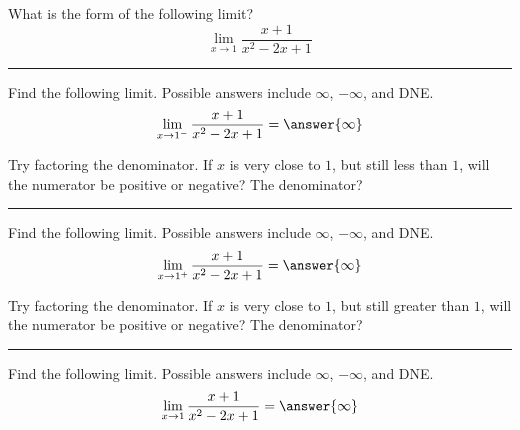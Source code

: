 \documentclass{ximera}
\author{Bobby Ramsey}
\begin{document}

\begin{exercise}


What is the form of the following limit?
	\[ \lim_{x\to1} \frac{x+1}{x^2-2x+1}\]

	\begin{multipleChoice}
	\end{multipleChoice}
	\noindent\rule[0.5ex]{\linewidth}{0.2pt}

	\begin{exercise}
		Find the following limit.  Possible answers include $\infty$, $-\infty$, and DNE.
		\[ \lim_{x\to1^-}\frac{x+1}{x^2-2x+1} = \answer{\infty} \]
		\begin{hint} Try factoring the denominator.   If $x$ is very close to $1$, but still less than $1$, will the numerator be positive or negative?  The denominator?\end{hint}
		\noindent\rule[0.5ex]{\linewidth}{0.2pt}
	
		\begin{exercise}
			Find the following limit.  Possible answers include $\infty$, $-\infty$, and DNE.
			\[ \lim_{x\to1^+}\frac{x+1}{x^2-2x+1} = \answer{\infty} \]
			\begin{hint} Try factoring the denominator.   If $x$ is very close to $1$, but still greater than $1$, will the numerator be positive or negative?  The denominator?\end{hint}
			\noindent\rule[0.5ex]{\linewidth}{0.2pt}
			
			\begin{exercise}
				Find the following limit.  Possible answers include $\infty$, $-\infty$, and DNE.
				\[ \lim_{x\to1}\frac{x+1}{x^2-2x+1} = \answer{\infty} \]
			\end{exercise}
		\end{exercise}
	\end{exercise}
\end{exercise}
\end{document}
